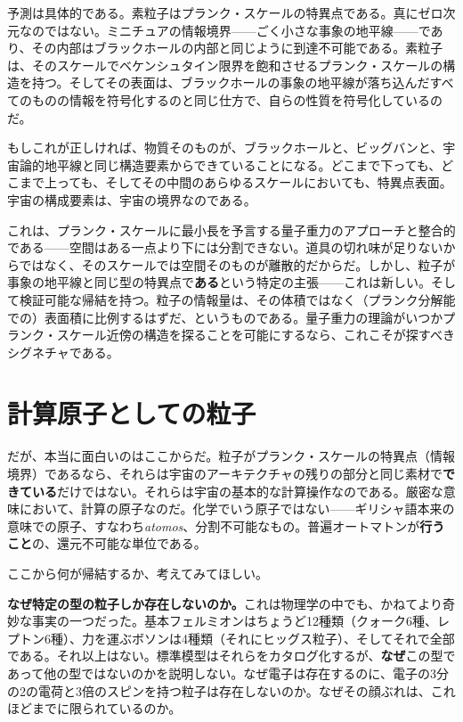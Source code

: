 \documentclass[11pt, twoside, openright]{book}
\begin{document}
予測は具体的である。素粒子はプランク・スケールの特異点である。真にゼロ次元なのではない。ミニチュアの情報境界------ごく小さな事象の地平線------であり、その内部はブラックホールの内部と同じように到達不可能である。素粒子は、そのスケールでベケンシュタイン限界を飽和させるプランク・スケールの構造を持つ。そしてその表面は、ブラックホールの事象の地平線が落ち込んだすべてのものの情報を符号化するのと同じ仕方で、自らの性質を符号化しているのだ。

もしこれが正しければ、物質そのものが、ブラックホールと、ビッグバンと、宇宙論的地平線と同じ構造要素からできていることになる。どこまで下っても、どこまで上っても、そしてその中間のあらゆるスケールにおいても、特異点表面。宇宙の構成要素は、宇宙の境界なのである。

これは、プランク・スケールに最小長を予言する量子重力のアプローチと整合的である------空間はある一点より下には分割できない。道具の切れ味が足りないからではなく、そのスケールでは空間そのものが離散的だからだ。しかし、粒子が事象の地平線と同じ型の特異点で\textbf{ある}という特定の主張------これは新しい。そして検証可能な帰結を持つ。粒子の情報量は、その体積ではなく（プランク分解能での）表面積に比例するはずだ、というものである。量子重力の理論がいつかプランク・スケール近傍の構造を探ることを可能にするなら、これこそが探すべきシグネチャである。

\section*{計算原子としての粒子}

だが、本当に面白いのはここからだ。粒子がプランク・スケールの特異点（情報境界）であるなら、それらは宇宙のアーキテクチャの残りの部分と同じ素材で\textbf{できている}だけではない。それらは宇宙の基本的な計算操作なのである。厳密な意味において、計算の原子なのだ。化学でいう原子ではない------ギリシャ語本来の意味での原子、すなわち\textit{atomos}、分割不可能なもの。普遍オートマトンが\textbf{行うこと}の、還元不可能な単位である。

ここから何が帰結するか、考えてみてほしい。

\textbf{なぜ特定の型の粒子しか存在しないのか。}これは物理学の中でも、かねてより奇妙な事実の一つだった。基本フェルミオンはちょうど12種類（クォーク6種、レプトン6種）、力を運ぶボソンは4種類（それにヒッグス粒子）、そしてそれで全部である。それ以上はない。標準模型はそれらをカタログ化するが、\textbf{なぜ}この型であって他の型ではないのかを説明しない。なぜ電子は存在するのに、電子の3分の2の電荷と3倍のスピンを持つ粒子は存在しないのか。なぜその顔ぶれは、これほどまでに限られているのか。
\end{document}
